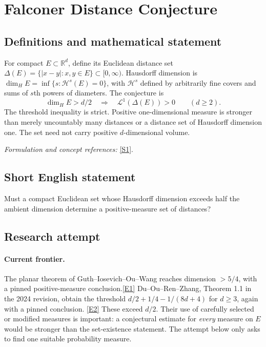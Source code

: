\documentclass[11pt,a4paper]{article}
\newcommand{\R}{\mathbb{R}}
\newcommand{\sref}[2]{\hyperlink{source:#1:#2}{[S#2]}}
\newcommand{\eref}[2]{\hyperlink{extra:#1:#2}{[E#2]}}
\newif\ifshowcatalogue
\newcommand{\cataloguescope}[1]{\ifshowcatalogue
 \paragraph{Exact scope in the supplied catalogue.}
 \begin{quote}\small #1\end{quote}\fi}
\begin{document}
\setcounter{section}{0}
\clearpage
\section*{\texorpdfstring{Falconer Distance Conjecture}{Falconer Distance Conjecture}}\label{statement}
\subsection{Definitions and mathematical statement}
For compact $E\subset\R^d$, define its Euclidean distance set
$\Delta(E)=\{|x-y|:x,y\in E\}\subset[0,\infty)$. Hausdorff dimension is
$\dim_H E=\inf\{s:\mathcal H^s(E)=0\}$, with $\mathcal H^s$ defined by arbitrarily fine covers and sums of $s$th powers of diameters. The conjecture is
\[
 \dim_H E>d/2\quad\Longrightarrow\quad \mathcal L^1(\Delta(E))>0
 \qquad(d\ge2).
\]
The threshold inequality is strict. Positive one-dimensional measure is stronger than merely uncountably many distances or a distance set of Hausdorff dimension one. The set need not carry positive $d$-dimensional volume.
\par\smallskip\textit{Formulation and concept references:} \sref{statement}{1}.
\cataloguescope{Prove or disprove that for every integer d>=2 and every compact set E in R\textasciicircum{}d with Hausdorff dimension greater than d/2, the distance set Delta(E)=\{|x-y|: x,y in E\} has positive one-dimensional Lebesgue measure.}
\subsection{Short English statement}
Must a compact Euclidean set whose Hausdorff dimension exceeds half the ambient dimension determine a positive-measure set of distances?
\subsection{Research attempt}

\paragraph{Current frontier.}
The planar theorem of Guth--Iosevich--Ou--Wang reaches dimension $>5/4$,
with a pinned positive-measure conclusion.\eref{statement}{1}
Du--Ou--Ren--Zhang, Theorem 1.1 in the 2024 revision, obtain the threshold
$d/2+1/4-1/(8d+4)$ for $d\ge3$, again with a pinned conclusion.
\eref{statement}{2} These exceed $d/2$. Their use of carefully selected or modified
measures is important: a conjectural estimate for \emph{every} measure on
$E$ would be stronger than the set-existence statement. The attempt below
only asks to find one suitable probability measure.
\end{document}
